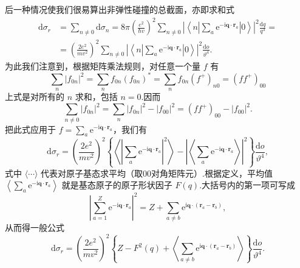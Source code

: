 后一种情况使我们很易算出非弹性碰撞的总截面，亦即求和式
\begin{equation}
\begin{aligned}
  \mathrm{d}\sigma_r&=\sum_{n\neq0}\mathrm{d}\sigma_n
  =8\pi\left(\frac{e^2}{\hbar v}\right)^2\sum_{n\neq0}
  \left|\left\langle n\left|\sum_a\mathrm{e}^{-\mathrm{i}\boldsymbol{q}\cdot\boldsymbol{r}_a}\right|0\right\rangle\right|^2
  \frac{\mathrm{d}q}{q^3}=\\
  &=\left(\frac{2e^2}{mv^2}\right)^2\sum_{n\neq0}
  \left|\left\langle n\left|\sum_a\mathrm{e}^{-\mathrm{i}\boldsymbol{q}\cdot\boldsymbol{r}_a}\right|0\right\rangle\right|^2
  \frac{\mathrm{d}o}{\vartheta^4}.
\end{aligned}
\end{equation}
为此我们注意到，根据矩阵乘法规则，对任意一个量 $f$ 有
\begin{equation*}
  \sum_n|f_{0n}|^2=\sum_nf_{0n}(f_{0n})^{*}
  =\sum_nf_{0n}(f^{+})_{n0}=(ff^{+})_{00}
\end{equation*}
上式是对所有的 $n$ 求和，包括 $n=0$.因而
\begin{equation}
  \sum_{n\neq0}|f_{0n}|^2=\sum_n|f_{0n}|^2-|f_{00}|^2=(ff^{+})_{00}-|f_{00}|^2.
\end{equation}
把此式应用于 $f=\sum_a\mathrm{e}^{-\mathrm{i}\boldsymbol{q}\cdot\boldsymbol{r}_a}$，我们有
\begin{equation}
  \mathrm{d}\sigma_r=\left(\frac{2e^2}{mv^2}\right)^2
  \left\{\left\langle\left|\sum_a\mathrm{e}^{-\mathrm{i}\boldsymbol{q}\cdot\boldsymbol{r}_a}\right|^2\right\rangle
  -\left|\left\langle\sum_a\mathrm{e}^{-\mathrm{i}\boldsymbol{q}\cdot\boldsymbol{r}_a}\right\rangle\right|^2\right\}
  \frac{\mathrm{d}o}{\vartheta^4},
\end{equation}
式中 $\langle\cdots\rangle$ 代表对原子基态求平均（取00对角矩阵元）.根据定义，平均值
$\left\langle\sum_a\mathrm{e}^{-\mathrm{i}\boldsymbol{q}\cdot\boldsymbol{r}_a}\right\rangle$
就是基态原子的原子形状因子 $F(q)$.大括号内的第一项可写成
\begin{equation*}
  \left|\sum_{a=1}^{Z}\mathrm{e}^{-\mathrm{i}\boldsymbol{q}\cdot\boldsymbol{r}_a}\right|^2
  =Z+\sum_{a\neq b}\mathrm{e}^{\mathrm{i}\boldsymbol{q}\cdot(\boldsymbol{r}_a-\boldsymbol{r}_b)},
\end{equation*}
从而得一般公式
\begin{equation}
  \mathrm{d}\sigma_r=\left(\frac{2e^2}{mv^2}\right)^2
  \left\{Z-F^2(q)+\left\langle\sum_{a\neq b}
  \mathrm{e}^{\mathrm{i}\boldsymbol{q}\cdot(\boldsymbol{r}_a-\boldsymbol{r}_b)}\right\rangle\right\}
  \frac{\mathrm{d}o}{\vartheta^4}.
\end{equation}
